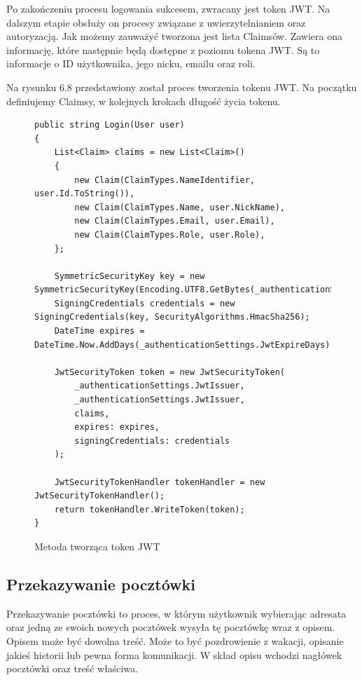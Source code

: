 \documentclass[a4paper,twoside,12pt]{book}
\begin{document}
Po zakończeniu procesu logowania sukcesem, zwracany jest token JWT. Na dalszym etapie obsłuży on procesy związane z uwierzytelnianiem oraz autoryzacją. Jak możemy zauważyć tworzona jest lista Claimsów. Zawiera ona informację, które następnie będą dostępne z poziomu tokena JWT. Są to informacje o ID użytkownika, jego nicku, emailu oraz roli.

Na rysunku 6.8 przedstawiony został proces tworzenia tokenu JWT. Na początku definiujemy Claimsy, w kolejnych krokach długość życia tokenu.
\newpage
\begin{figure}[H]
\begin{lstlisting}
public string Login(User user)
{
    List<Claim> claims = new List<Claim>()
    {
        new Claim(ClaimTypes.NameIdentifier, user.Id.ToString()),
        new Claim(ClaimTypes.Name, user.NickName),
        new Claim(ClaimTypes.Email, user.Email),
        new Claim(ClaimTypes.Role, user.Role),
    };

    SymmetricSecurityKey key = new SymmetricSecurityKey(Encoding.UTF8.GetBytes(_authenticationSettings.JwtKey));
    SigningCredentials credentials = new SigningCredentials(key, SecurityAlgorithms.HmacSha256);
    DateTime expires = DateTime.Now.AddDays(_authenticationSettings.JwtExpireDays);

    JwtSecurityToken token = new JwtSecurityToken(
        _authenticationSettings.JwtIssuer,
        _authenticationSettings.JwtIssuer,
        claims,
        expires: expires,
        signingCredentials: credentials
    );

    JwtSecurityTokenHandler tokenHandler = new JwtSecurityTokenHandler();
    return tokenHandler.WriteToken(token);
}
\end{lstlisting}
\caption{Metoda tworząca token JWT}
\label{fig:pseudokod:listings}
\end{figure}
\newpage
\subsection{Przekazywanie pocztówki}
Przekazywanie pocztówki to proces, w którym użytkownik wybierając adresata oraz jedną ze swoich nowych pocztówek wysyła tę pocztówkę wraz z opisem. Opisem może być dowolna treść. Może to być pozdrowienie z wakacji, opisanie jakieś historii lub pewna forma komunikacji. W skład opisu wchodzi nagłówek pocztówki oraz treść właściwa. 
\end{document}
